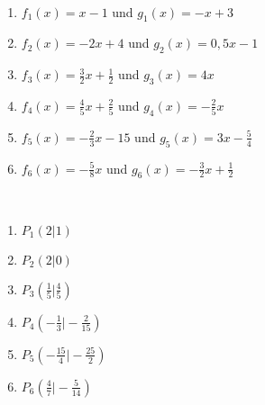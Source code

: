 \begin{Exercise}[title={Bestimme jeweils den Schnittpunkt}, label=schnittpunktA1]\\
	\begin{minipage}{0.5\textwidth}
		\begin{enumerate}[label=\alph*)]
			\item $f_1(x)=x-1$ und $g_1(x)=-x+3$
			\item $f_2(x)=-2x+4$ und $g_2(x)=0,5x-1$
			\item $f_3(x)=\frac{3}{2}x+\frac{1}{2}$ und $g_3(x)=4x$
		\end{enumerate}
	\end{minipage}
	\begin{minipage}{0.5\textwidth}
		\begin{enumerate}[label=\alph*)]
			\setcounter{enumi}{3}
			\item $f_4(x)=\frac{4}{5}x+\frac{2}{5}$ und $g_4(x)=-\frac{2}{5}x$
			\item $f_5(x)=-\frac{2}{3}x-15$ und $g_5(x)=3x-\frac{5}{4}$
			\item $f_6(x)=-\frac{5}{8}x$ und $g_6(x)=-\frac{3}{2}x+\frac{1}{2}$
		\end{enumerate}
	\end{minipage}
\end{Exercise}\vspace{.5cm}
\begin{Answer}[ref=schnittpunktA1]\\
	\begin{minipage}{0.5\textwidth}
		\begin{enumerate}[label=\alph*)]
			\item $P_1\left(2\vert 1\right)$
			\item $P_2\left(2\vert 0\right)$
			\item $P_3\left(\frac{1}{5}\vert \frac{4}{5}\right)$
		\end{enumerate}
	\end{minipage}
	\begin{minipage}{0.5\textwidth}
		\begin{enumerate}[label=\alph*)]
			\setcounter{enumi}{3}
			\item $P_4\left(-\frac{1}{3}\vert -\frac{2}{15}\right)$
			\item $P_5\left(-\frac{15}{4}\vert -\frac{25}{2}\right)$
			\item $P_6\left(\frac{4}{7}\vert -\frac{5}{14}\right)$
		\end{enumerate}
	\end{minipage}
\end{Answer}
